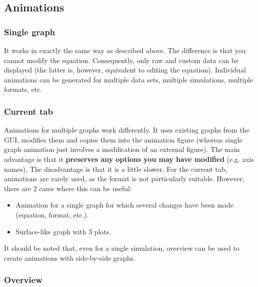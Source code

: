 \documentclass{article}
\begin{document}
\subsection{Animations}

\subsubsection{Single graph}

It works in exactly the same way as described above. The difference is that you cannot modify the equation. Consequently, only raw and custom data can be displayed (the latter is, however, equivalent to editing the equation). Individual animations can be generated for multiple data sets, multiple simulations, multiple formats, etc.

\subsubsection{Current tab}

Animations for multiple graphs work differently. It uses existing graphs from the GUI, modifies them and copies them into the animation figure (whereas single graph animation just involves a modification of an external figure). The main advantage is that it \textbf{preserves any options you may have modified} (e.g. axis names). The disadvantage is that it is a little slower. For the current tab, animations are rarely used, as the format is not particularly suitable. However, there are 2 cases where this can be useful:

\begin{itemize}
    \item Animation for a single graph for which several changes have been made (equation, format, etc.).
    \item Surface-like graph with 3 plots.
\end{itemize}

It should be noted that, even for a single simulation, overview can be used to create animations with side-by-side graphs.

\subsubsection{Overview}
\end{document}
